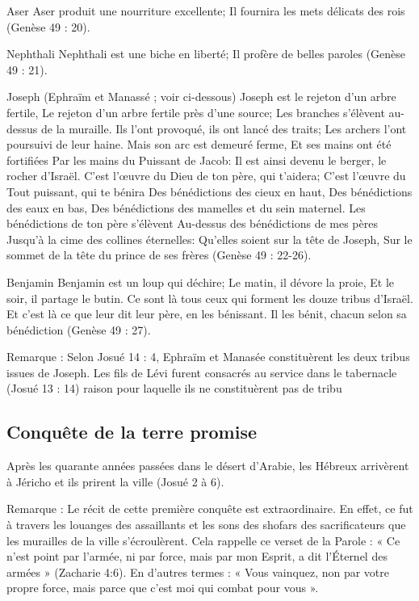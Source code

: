 Aser
Aser produit une nourriture excellente; Il fournira les mets délicats des rois (Genèse 49 : 20).

Nephthali
Nephthali est une biche en liberté; Il profère de belles paroles (Genèse 49 : 21).
 
Joseph (Ephraïm et Manassé ; voir ci-dessous)
Joseph est le rejeton d'un arbre fertile, Le rejeton d'un arbre fertile près d'une source; Les branches s'élèvent au-dessus de la muraille. Ils l'ont provoqué, ils ont lancé des traits; Les archers l'ont poursuivi de leur haine. Mais son arc est demeuré ferme, Et ses mains ont été fortifiées Par les mains du Puissant de Jacob: Il est ainsi devenu le berger, le rocher d'Israël. C'est l’œuvre du Dieu de ton père, qui t'aidera; C'est l’œuvre du Tout puissant, qui te bénira Des bénédictions des cieux en haut, Des bénédictions des eaux en bas, Des bénédictions des mamelles et du sein maternel. Les bénédictions de ton père s'élèvent Au-dessus des bénédictions de mes pères Jusqu'à la cime des collines éternelles: Qu'elles soient sur la tête de Joseph, Sur le sommet de la tête du prince de ses frères (Genèse 49 : 22-26).

Benjamin
Benjamin est un loup qui déchire; Le matin, il dévore la proie, Et le soir, il partage le butin. Ce sont là tous ceux qui forment les douze tribus d'Israël. Et c'est là ce que leur dit leur père, en les bénissant. Il les bénit, chacun selon sa bénédiction (Genèse 49 : 27).

Remarque : Selon Josué 14 : 4, Ephraïm et Manasée constituèrent les deux tribus issues de Joseph. Les fils de Lévi furent consacrés au service dans le tabernacle (Josué 13 : 14) raison pour laquelle ils ne constituèrent pas de tribu

\subsection*{Conquête de la terre promise}

Après les quarante années passées dans le désert d'Arabie, les Hébreux arrivèrent à Jéricho et ils prirent la ville (Josué 2 à 6).

Remarque : Le récit de cette première conquête est extraordinaire. En effet, ce fut à travers les louanges des assaillants et les sons des shofars des sacrificateurs que les murailles de la ville s'écroulèrent. Cela rappelle ce verset de la Parole : « Ce n'est point par l'armée, ni par force, mais par mon Esprit, a dit l’Éternel des armées » (Zacharie 4:6). En d'autres termes : « Vous vainquez, non par votre propre force, mais parce que c'est moi qui combat pour vous ».

